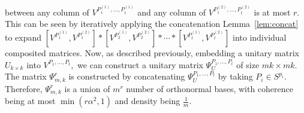 \documentclass{IEEEtran}
\newtheorem{theorem}{Theorem}[section]
\newtheorem{remark}[theorem]{Remark}
\begin{document}
between any column of $V^{P^{(1)}_{1},\dots,P^{(1)}_{t}}$ and any column of
$V^{P^{(2)}_{1},\dots,P^{(2)}_{t}}$ is at most $r.$ This can be seen by iteratively
applying the concatenation Lemma~\ref{lem:concat} to expand
$[V^{P_1^{(1)}},V^{P_1^{(2)}}] \ast [V^{P_2^{(1)}},V^{P_2^{(2)}}] \ast \cdots
\ast [V^{P_t^{(1)}},V^{P_t^{(2)}}]$ into individual composited matrices.
Now, as described previously, embedding a unitary matrix $U_{k\times k}$ into $V^{P_{1},\dots,P_{t}},$ we can construct a unitary matrix
$\Psi^{P_{1},\dots,P_{t}}_{U}$  of size $mk \times mk.$
The matrix $\Psi^{r}_{m,k}$ is constructed by
concatenating $\Psi^{P_{1},\dots,P_{t}}_{U}$ by taking
$P_{i}\in S^{p_{i}}.$ 
Therefore,
$\Psi^{r}_{m,k}$ is a union of $m^{r}$ number of orthonormal bases, with
coherence being at most $\min(r\alpha^{2},1)$ and density being $\frac{1}{m}$.

%
\end{document}
